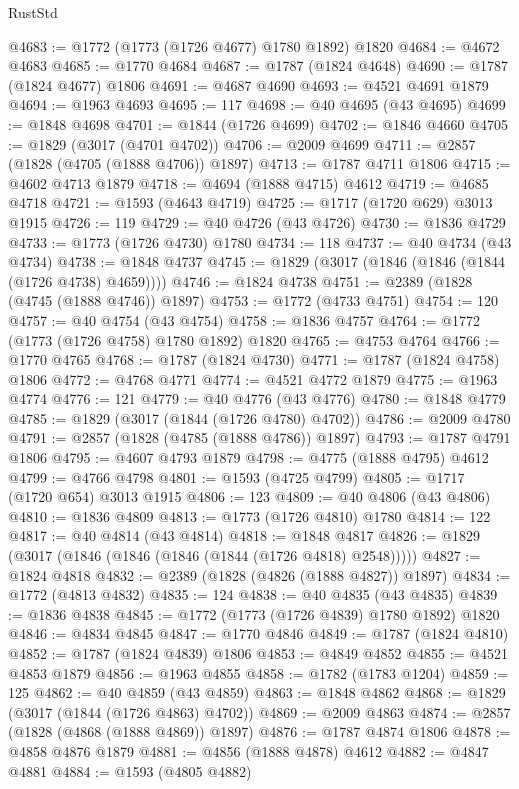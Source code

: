 \begin{lexlean}{RustStd}
\begin{coremodule}
@4683 := @1772 (@1773 (@1726 @4677) @1780 @1892) @1820
@4684 := @4672 @4683
@4685 := @1770 @4684
@4687 := @1787 (@1824 @4648)
@4690 := @1787 (@1824 @4677) @1806
@4691 := @4687 @4690
@4693 := @4521 @4691 @1879
@4694 := @1963 @4693
@4695 := 117
@4698 := @40 @4695 (@43 @4695)
@4699 := @1848 @4698
@4701 := @1844 (@1726 @4699)
@4702 := @1846 @4660
@4705 := @1829 (@3017 (@4701 @4702))
@4706 := @2009 @4699
@4711 := @2857 (@1828 (@4705 (@1888 @4706)) @1897)
@4713 := @1787 @4711 @1806
@4715 := @4602 @4713 @1879
@4718 := @4694 (@1888 @4715) @4612
@4719 := @4685 @4718
@4721 := @1593 (@4643 @4719)
@4725 := @1717 (@1720 @629) @3013 @1915
@4726 := 119
@4729 := @40 @4726 (@43 @4726)
@4730 := @1836 @4729
@4733 := @1773 (@1726 @4730) @1780
@4734 := 118
@4737 := @40 @4734 (@43 @4734)
@4738 := @1848 @4737
@4745 := @1829 (@3017 (@1846 (@1846 (@1844 (@1726 @4738) @4659))))
@4746 := @1824 @4738
@4751 := @2389 (@1828 (@4745 (@1888 @4746)) @1897)
@4753 := @1772 (@4733 @4751)
@4754 := 120
@4757 := @40 @4754 (@43 @4754)
@4758 := @1836 @4757
@4764 := @1772 (@1773 (@1726 @4758) @1780 @1892) @1820
@4765 := @4753 @4764
@4766 := @1770 @4765
@4768 := @1787 (@1824 @4730)
@4771 := @1787 (@1824 @4758) @1806
@4772 := @4768 @4771
@4774 := @4521 @4772 @1879
@4775 := @1963 @4774
@4776 := 121
@4779 := @40 @4776 (@43 @4776)
@4780 := @1848 @4779
@4785 := @1829 (@3017 (@1844 (@1726 @4780) @4702))
@4786 := @2009 @4780
@4791 := @2857 (@1828 (@4785 (@1888 @4786)) @1897)
@4793 := @1787 @4791 @1806
@4795 := @4607 @4793 @1879
@4798 := @4775 (@1888 @4795) @4612
@4799 := @4766 @4798
@4801 := @1593 (@4725 @4799)
@4805 := @1717 (@1720 @654) @3013 @1915
@4806 := 123
@4809 := @40 @4806 (@43 @4806)
@4810 := @1836 @4809
@4813 := @1773 (@1726 @4810) @1780
@4814 := 122
@4817 := @40 @4814 (@43 @4814)
@4818 := @1848 @4817
@4826 := @1829 (@3017 (@1846 (@1846 (@1846 (@1844 (@1726 @4818) @2548)))))
@4827 := @1824 @4818
@4832 := @2389 (@1828 (@4826 (@1888 @4827)) @1897)
@4834 := @1772 (@4813 @4832)
@4835 := 124
@4838 := @40 @4835 (@43 @4835)
@4839 := @1836 @4838
@4845 := @1772 (@1773 (@1726 @4839) @1780 @1892) @1820
@4846 := @4834 @4845
@4847 := @1770 @4846
@4849 := @1787 (@1824 @4810)
@4852 := @1787 (@1824 @4839) @1806
@4853 := @4849 @4852
@4855 := @4521 @4853 @1879
@4856 := @1963 @4855
@4858 := @1782 (@1783 @1204)
@4859 := 125
@4862 := @40 @4859 (@43 @4859)
@4863 := @1848 @4862
@4868 := @1829 (@3017 (@1844 (@1726 @4863) @4702))
@4869 := @2009 @4863
@4874 := @2857 (@1828 (@4868 (@1888 @4869)) @1897)
@4876 := @1787 @4874 @1806
@4878 := @4858 @4876 @1879
@4881 := @4856 (@1888 @4878) @4612
@4882 := @4847 @4881
@4884 := @1593 (@4805 @4882)

\end{coremodule}
\end{lexlean}
